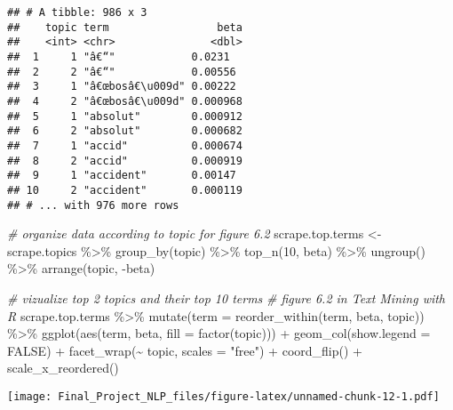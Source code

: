 \documentclass[
]{article}
\newenvironment{Shaded}{\begin{snugshade}}{\end{snugshade}}
\newcommand{\AttributeTok}[1]{\textcolor[rgb]{0.77,0.63,0.00}{#1}}
\newcommand{\CommentTok}[1]{\textcolor[rgb]{0.56,0.35,0.01}{\textit{#1}}}
\newcommand{\ConstantTok}[1]{\textcolor[rgb]{0.00,0.00,0.00}{#1}}
\newcommand{\DecValTok}[1]{\textcolor[rgb]{0.00,0.00,0.81}{#1}}
\newcommand{\FunctionTok}[1]{\textcolor[rgb]{0.00,0.00,0.00}{#1}}
\newcommand{\NormalTok}[1]{#1}
\newcommand{\OtherTok}[1]{\textcolor[rgb]{0.56,0.35,0.01}{#1}}
\newcommand{\SpecialCharTok}[1]{\textcolor[rgb]{0.00,0.00,0.00}{#1}}
\newcommand{\StringTok}[1]{\textcolor[rgb]{0.31,0.60,0.02}{#1}}
\begin{document}
\begin{verbatim}
## # A tibble: 986 x 3
##    topic term                 beta
##    <int> <chr>               <dbl>
##  1     1 "â€“"            0.0231  
##  2     2 "â€“"            0.00556 
##  3     1 "â€œbosâ€\u009d" 0.00222 
##  4     2 "â€œbosâ€\u009d" 0.000968
##  5     1 "absolut"        0.000912
##  6     2 "absolut"        0.000682
##  7     1 "accid"          0.000674
##  8     2 "accid"          0.000919
##  9     1 "accident"       0.00147 
## 10     2 "accident"       0.000119
## # ... with 976 more rows
\end{verbatim}

\begin{Shaded}
\begin{Highlighting}[]
\CommentTok{\# organize data according to \textquotesingle{}topic\textquotesingle{} for figure 6.2}
\NormalTok{scrape.top.terms }\OtherTok{\textless{}{-}}\NormalTok{ scrape.topics }\SpecialCharTok{\%\textgreater{}\%}
  \FunctionTok{group\_by}\NormalTok{(topic) }\SpecialCharTok{\%\textgreater{}\%}
  \FunctionTok{top\_n}\NormalTok{(}\DecValTok{10}\NormalTok{, beta) }\SpecialCharTok{\%\textgreater{}\%}
  \FunctionTok{ungroup}\NormalTok{() }\SpecialCharTok{\%\textgreater{}\%}
  \FunctionTok{arrange}\NormalTok{(topic, }\SpecialCharTok{{-}}\NormalTok{beta)}

\CommentTok{\# vizualize top 2 topics and their top 10 terms}
\CommentTok{\# figure 6.2 in Text Mining with R}
\NormalTok{scrape.top.terms }\SpecialCharTok{\%\textgreater{}\%}
  \FunctionTok{mutate}\NormalTok{(}\AttributeTok{term =} \FunctionTok{reorder\_within}\NormalTok{(term, beta, topic)) }\SpecialCharTok{\%\textgreater{}\%}
  \FunctionTok{ggplot}\NormalTok{(}\FunctionTok{aes}\NormalTok{(term, beta, }\AttributeTok{fill =} \FunctionTok{factor}\NormalTok{(topic))) }\SpecialCharTok{+}
  \FunctionTok{geom\_col}\NormalTok{(}\AttributeTok{show.legend =} \ConstantTok{FALSE}\NormalTok{) }\SpecialCharTok{+}
  \FunctionTok{facet\_wrap}\NormalTok{(}\SpecialCharTok{\textasciitilde{}}\NormalTok{ topic, }\AttributeTok{scales =} \StringTok{"free"}\NormalTok{) }\SpecialCharTok{+}
  \FunctionTok{coord\_flip}\NormalTok{() }\SpecialCharTok{+}
  \FunctionTok{scale\_x\_reordered}\NormalTok{()}
\end{Highlighting}
\end{Shaded}

\texttt{[image: Final\_Project\_NLP\_files/figure-latex/unnamed-chunk-12-1.pdf]}
\end{document}
